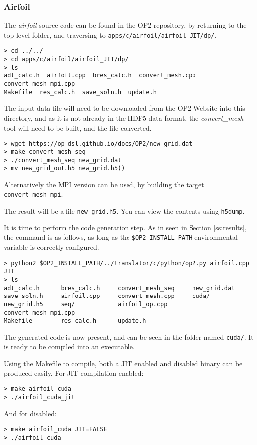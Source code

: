 \subsubsection{Airfoil}
The \textit{airfoil} source code can be found in the OP2 repository, by returning to the top level folder, and traversing to \verb|apps/c/airfoil/airfoil_JIT/dp/|.
\begin{verbatim}
> cd ../../
> cd apps/c/airfoil/airfoil_JIT/dp/
> ls
adt_calc.h  airfoil.cpp  bres_calc.h  convert_mesh.cpp  convert_mesh_mpi.cpp
Makefile  res_calc.h  save_soln.h  update.h
\end{verbatim}
The input data file will need to be downloaded from the OP2 Website into this directory, and as it is not already in the HDF5 data format, the \textit{convert\_mesh} tool will need to be built, and the file converted.
\begin{verbatim}
> wget https://op-dsl.github.io/docs/OP2/new_grid.dat
> make convert_mesh_seq
> ./convert_mesh_seq new_grid.dat
> mv new_grid_out.h5 new_grid.h5))
\end{verbatim}
Alternatively the MPI version can be used, by building the target \verb|convert_mesh_mpi|.
\par
The result will be a file \verb|new_grid.h5|. You can view the contents using \verb|h5dump|.


\noindent It is time to perform the code generation step. As in seen in Section \ref{ss:results}, the command is as follows, as long as the \verb|$OP2_INSTALL_PATH| environmental variable is correctly configured.
\begin{verbatim}
> python2 $OP2_INSTALL_PATH/../translator/c/python/op2.py airfoil.cpp JIT
> ls
adt_calc.h      bres_calc.h     convert_mesh_seq     new_grid.dat
save_soln.h     airfoil.cpp     convert_mesh.cpp     cuda/
new_grid.h5     seq/            airfoil_op.cpp       convert_mesh_mpi.cpp
Makefile        res_calc.h      update.h
\end{verbatim}
The generated code is now present, and can be seen in the folder named \verb|cuda/|. It is ready to be compiled into an executable.


\noindent Using the Makefile to compile, both a JIT enabled and disabled binary can be produced easily. For JIT compilation enabled:
\begin{verbatim}
> make airfoil_cuda
> ./airfoil_cuda_jit
\end{verbatim}
And for disabled:
\begin{verbatim}
> make airfoil_cuda JIT=FALSE
> ./airfoil_cuda
\end{verbatim}

